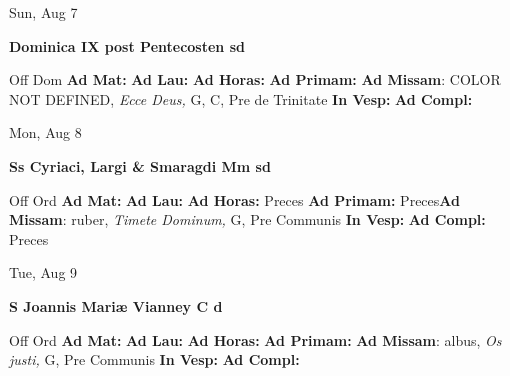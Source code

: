 \documentclass[10pt]{memoir}
\begin{document}
\begin{center}
\begin{minipage}{3.5in}
\vspace{2em}
\begin{center}Sun, Aug 7
\end{center}
\textbf{ \large Dominica IX post Pentecosten
\textnormal{\normalsize sd}}

\begin{justify}Off Dom
\textbf{Ad Mat: }
\textbf{Ad Lau: }
\textbf{Ad Horas: }
\textbf{Ad Primam: }\textbf{Ad Missam}: COLOR NOT DEFINED, \textit{Ecce Deus,} G, C, Pre de Trinitate
\textbf{In Vesp: }
\textbf{Ad Compl: }
\end{justify}
\end{minipage}
\end{center}

\begin{center}
\begin{minipage}{3.5in}
\vspace{2em}
\begin{center}Mon, Aug 8
\end{center}
\textbf{ \large Ss Cyriaci, Largi \& Smaragdi Mm
\textnormal{\normalsize sd}}

\begin{justify}Off Ord
\textbf{Ad Mat: }
\textbf{Ad Lau: }
\textbf{Ad Horas: }Preces
\textbf{Ad Primam: }Preces\textbf{Ad Missam}: ruber, \textit{Timete Dominum,} G, Pre Communis
\textbf{In Vesp: }
\textbf{Ad Compl: }Preces
\end{justify}
\end{minipage}
\end{center}

\begin{center}
\begin{minipage}{3.5in}
\vspace{2em}
\begin{center}Tue, Aug 9
\end{center}
\textbf{ \large S Joannis Mariæ Vianney C
\textnormal{\normalsize d}}

\begin{justify}Off Ord
\textbf{Ad Mat: }
\textbf{Ad Lau: }
\textbf{Ad Horas: }
\textbf{Ad Primam: }\textbf{Ad Missam}: albus, \textit{Os justi,} G, Pre Communis
\textbf{In Vesp: }
\textbf{Ad Compl: }
\end{justify}
\end{minipage}
\end{center}
\end{document}
